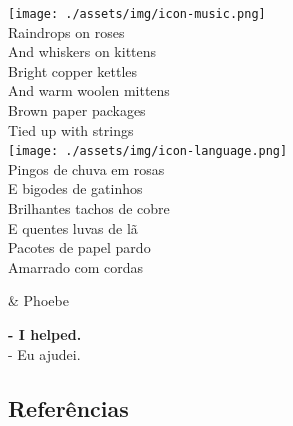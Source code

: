 \bigskip
\begin{tcolorbox}[enhanced,
    drop fuzzy shadow southeast, boxrule=0.3pt,
    lower separated=false, sidebyside, sidebyside align=top,
    halign=flush right, halign lower=left,
    colframe=black!30!dialogoBorder,colback=musicaBg]
\texttt{[image: ./assets/img/icon-music.png]}\\
Raindrops on roses\\And whiskers on kittens\\Bright copper kettles\\And warm woolen mittens\\Brown paper packages\\Tied up with strings\\
\tcblower
\texttt{[image: ./assets/img/icon-language.png]}\\
Pingos de chuva em rosas\\E bigodes de gatinhos\\Brilhantes tachos de cobre\\E quentes luvas de lã\\Pacotes de papel pardo\\Amarrado com cordas\\
\end{tcolorbox}

\begin{tcolorbox}[enhanced,center upper,
    drop fuzzy shadow southeast, boxrule=0.3pt,
    lower separated=false,
    colframe=black!30!dialogoBorder,colback=white]
\begin{minipage}[c]{0.14\linewidth}
   & \centering \scriptsize{Phoebe}
\end{minipage}
\hspace{.1mm}
\begin{minipage}[c]{0.8\linewidth}
  \textbf{- I helped.}\\
  - Eu ajudei.
\end{minipage}
\end{tcolorbox}

\hypertarget{referuxeancias-2}{%
\subsection{Referências}\label{referuxeancias-2}}

